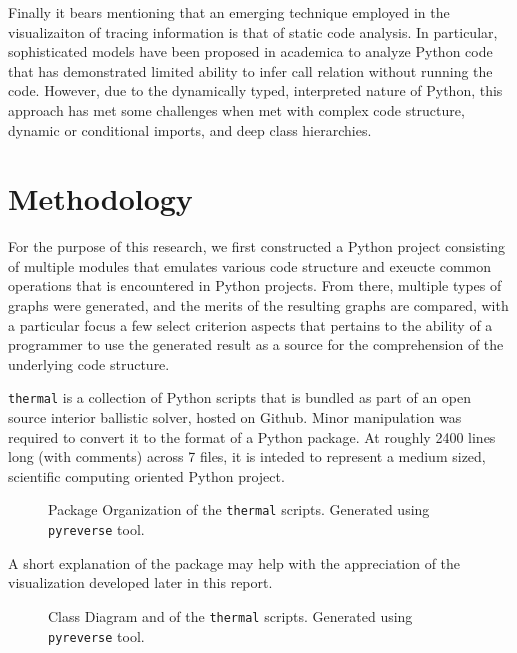 \documentclass[conference]{IEEEtran}
\begin{document}
Finally it bears mentioning that an emerging technique employed in the visualizaiton of tracing information is that of static code analysis. In particular, sophisticated models have been proposed in academica to analyze Python code that has demonstrated limited ability to infer call relation without running the code\cite{salis2021pycg}. However, due to the dynamically typed, interpreted nature of Python, this approach has met some challenges when met with complex code structure, dynamic or conditional imports, and deep class hierarchies. \par

\section{Methodology}
For the purpose of this research, we first constructed a Python project consisting of multiple modules that emulates various code structure and exeucte common operations that is encountered in Python projects. From there, multiple types of graphs were generated, and the merits of the resulting graphs are compared, with a particular focus a few select criterion aspects that pertains to the ability of a programmer to use the generated result as a source for the comprehension of the underlying code structure.\par

\texttt{thermal} is a collection of Python scripts that is bundled as part of an open source interior ballistic solver, hosted on Github\cite{pibs}. Minor manipulation was required to convert it to the format of a Python package. At roughly 2400 lines long (with comments) across 7 files, it is inteded to represent a medium sized, scientific computing oriented Python project.\par
\begin{figure}[htpb]
  \centering
    
  \caption{Package Organization of the \texttt{thermal} scripts. Generated using \texttt{pyreverse} tool.}
  \label{thermal: package diagram}
\end{figure}
A short explanation of the package may help with the appreciation of the visualization developed later in this report.\par
\begin{figure}[htpb]
  \centering
    
  \caption{Class Diagram and of the \texttt{thermal} scripts. Generated using \texttt{pyreverse} tool.}
  \label{thermal: class diagram}
\end{figure}
\end{document}
